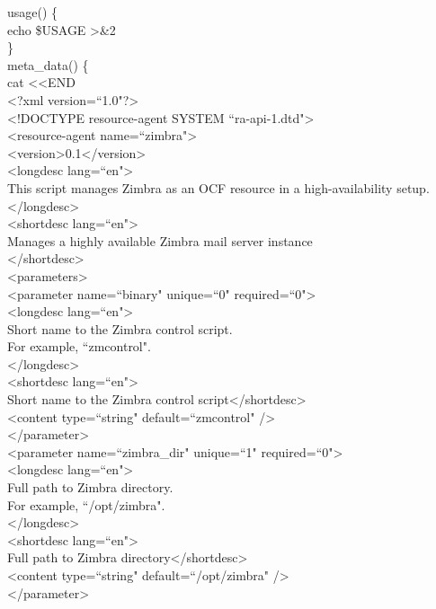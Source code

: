 \documentclass[a4paper, 12pt]{book}
\begin{document}
\noindent usage() \{\\
    \indent echo \$USAGE \textgreater\&2\\
\}\\

\noindent meta\_data() \{\\

\noindent cat \textless \textless END\\
        
\noindent \textless ?xml version=``1.0"?\textgreater\\
\textless !DOCTYPE resource-agent SYSTEM ``ra-api-1.dtd"\textgreater\\
\textless resource-agent name=``zimbra"\textgreater\\
\textless version\textgreater0.1\textless /version\textgreater\\
\textless longdesc lang=``en"\textgreater\\
\indent This script manages Zimbra as an OCF resource in a high-availability setup.\\
\textless /longdesc\textgreater\\
\textless shortdesc lang=``en"\textgreater\\
\indent Manages a highly available Zimbra mail server instance\\
\textless /shortdesc\textgreater\\

\noindent \textless parameters\textgreater\\

\noindent \textless parameter name=``binary" unique=``0" required=``0"\textgreater\\
\textless longdesc lang=``en"\textgreater\\
\indent Short name to the Zimbra control script.\\
\indent For example, ``zmcontrol".\\
\textless /longdesc\textgreater\\
\textless shortdesc lang=``en"\textgreater\\
\indent Short name to the Zimbra control script\textless /shortdesc\textgreater\\
\textless content type=``string" default=``zmcontrol" /\textgreater\\
\textless /parameter\textgreater\\

\noindent \textless parameter name=``zimbra\_dir" unique=``1" required=``0"\textgreater\\
\textless longdesc lang=``en"\textgreater\\
\indent Full path to Zimbra directory.\\
\indent For example, ``/opt/zimbra".\\
\textless /longdesc\textgreater\\
\textless shortdesc lang=``en"\textgreater\\
\indent Full path to Zimbra directory\textless /shortdesc\textgreater\\
\textless content type=``string" default=``/opt/zimbra" /\textgreater\\
\textless /parameter\textgreater\\
\end{document}
